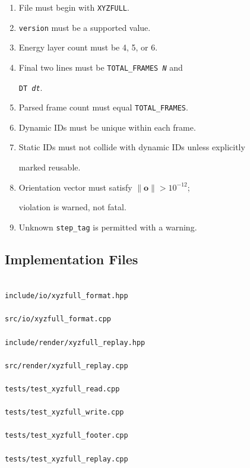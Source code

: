 \documentclass[12pt, a4paper, oneside]{article}
\begin{document}
\begin{enumerate}

  \item File must begin with \texttt{XYZFULL}.

  \item \texttt{version} must be a supported value.

  \item Energy layer count must be 4, 5, or 6.

  \item Final two lines must be \texttt{TOTAL\_FRAMES \textit{N}} and

        \texttt{DT \textit{dt}}.

  \item Parsed frame count must equal \texttt{TOTAL\_FRAMES}.

  \item Dynamic IDs must be unique within each frame.

  \item Static IDs must not collide with dynamic IDs unless explicitly

        marked reusable.

  \item Orientation vector must satisfy $\|\mathbf{o}\| > 10^{-12}$;

        violation is warned, not fatal.

  \item Unknown \texttt{step\_tag} is permitted with a warning.

\end{enumerate}


\subsection{Implementation Files}


\begin{lstlisting}[language={},frame=single]

include/io/xyzfull_format.hpp

src/io/xyzfull_format.cpp

include/render/xyzfull_replay.hpp

src/render/xyzfull_replay.cpp

tests/test_xyzfull_read.cpp

tests/test_xyzfull_write.cpp

tests/test_xyzfull_footer.cpp

tests/test_xyzfull_replay.cpp

\end{lstlisting}
\end{document}
